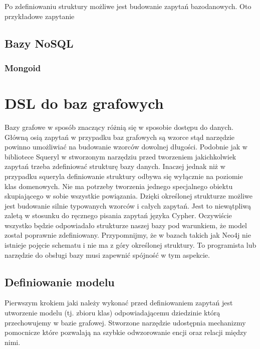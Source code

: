 \documentclass[brudnopis]{xmgr}
\begin{document}


Po zdefiniowaniu struktury możliwe jest budowanie zapytań bazodanowych. Oto przykładowe zapytanie 



\section{Bazy NoSQL}

\subsection{Mongoid}

\chapter{DSL do baz grafowych}

Bazy grafowe w sposób znaczący różnią się w sposobie dostępu do danych. Główną osią zapytań w przypadku baz grafowych są wzorce stąd narzędzie powinno umożliwiać na budowanie wzorców dowolnej długości. Podobnie jak w bibliotece Squeryl w stworzonym narzędziu przed tworzeniem jakichkolwiek zapytań trzeba zdefiniować strukturę bazy danych. Inaczej jednak niż w przypadku squeryla definiowanie struktury odbywa się wyłącznie na poziomie klas domenowych. Nie ma potrzeby tworzenia jednego specjalnego obiektu skupiającego w sobie wszystkie powiązania. Dzięki określonej strukturze możliwe jest budowanie silnie typowanych wzorców i całych zapytań. Jest to niewątpliwą zaletą w stosunku do ręcznego pisania zapytań języka Cypher. Oczywiście wszystko będzie odpowiadało strukturze naszej bazy pod warunkiem, że model został poprawnie zdefiniowany. Przypomnijmy, że w bazach takich jak Neo4j nie istnieje pojęcie schematu i nie ma z góry określonej struktury. To programista lub narzędzie do obsługi bazy musi zapewnić spójność w tym aspekcie.

\section{Definiowanie modelu}

Pierwszym krokiem jaki należy wykonać przed definiowaniem zapytań jest utworzenie modelu (tj. zbioru klas) odpowiadającemu dziedzinie którą przechowujemy w bazie grafowej. Stworzone narzędzie udostępnia mechanizmy pomocnicze które pozwalają na szybkie odwzorowanie encji oraz relacji między nimi.
\end{document}
